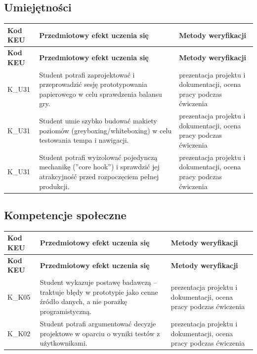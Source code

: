 \documentclass[12pt, a4paper]{article}
\newcommand{\thdrule}{\noalign{\global\setlength{\extrarowheight}{0pt}}}
\newcommand{\thdend}{\noalign{\global\setlength{\extrarowheight}{3pt}}}
\begin{document}
\subsection*{Umiejętności}
{\scriptsize
\begin{longtable}{m{1.6cm}m{9.0cm}m{4.2cm}}
\thdrule\toprule
\rowcolor{pjatkRed} {\color{white}\footnotesize\textbf{\vphantom{Ag}Kod KEU}} & {\color{white}\footnotesize\textbf{\vphantom{Ag}Przedmiotowy efekt uczenia się}} & {\color{white}\footnotesize\textbf{\vphantom{Ag}Metody weryfikacji}} \\
\midrule\thdend
\endfirsthead
\thdrule\toprule
\rowcolor{pjatkRed} {\color{white}\footnotesize\textbf{\vphantom{Ag}Kod KEU}} & {\color{white}\footnotesize\textbf{\vphantom{Ag}Przedmiotowy efekt uczenia się}} & {\color{white}\footnotesize\textbf{\vphantom{Ag}Metody weryfikacji}} \\
\midrule\thdend
\endhead
  \rowcolor{tableRowLight} K\_U31 & Student potrafi zaprojektować i przeprowadzić sesję prototypowania papierowego w celu sprawdzenia balansu gry. & prezentacja projektu i dokumentacji, ocena pracy podczas ćwiczenia \\
  \rowcolor{tableRowAlt} K\_U31 & Student umie szybko budować makiety poziomów (greyboxing/whiteboxing) w celu testowania tempa i nawigacji. & prezentacja projektu i dokumentacji, ocena pracy podczas ćwiczenia \\
  \rowcolor{tableRowLight} K\_U31 & Student potrafi wyizolować pojedynczą mechanikę (''core hook'') i sprawdzić jej atrakcyjność przed rozpoczęciem pełnej produkcji. & prezentacja projektu i dokumentacji, ocena pracy podczas ćwiczenia \\
\bottomrule
\end{longtable}}

\subsection*{Kompetencje społeczne}
{\scriptsize
\begin{longtable}{m{1.6cm}m{9.0cm}m{4.2cm}}
\thdrule\toprule
\rowcolor{pjatkRed} {\color{white}\footnotesize\textbf{\vphantom{Ag}Kod KEU}} & {\color{white}\footnotesize\textbf{\vphantom{Ag}Przedmiotowy efekt uczenia się}} & {\color{white}\footnotesize\textbf{\vphantom{Ag}Metody weryfikacji}} \\
\midrule\thdend
\endfirsthead
\thdrule\toprule
\rowcolor{pjatkRed} {\color{white}\footnotesize\textbf{\vphantom{Ag}Kod KEU}} & {\color{white}\footnotesize\textbf{\vphantom{Ag}Przedmiotowy efekt uczenia się}} & {\color{white}\footnotesize\textbf{\vphantom{Ag}Metody weryfikacji}} \\
\midrule\thdend
\endhead
  \rowcolor{tableRowLight} K\_K05 & Student wykazuje postawę badawczą – traktuje błędy w prototypie jako cenne źródło danych, a nie porażkę programistyczną. & prezentacja projektu i dokumentacji, ocena pracy podczas ćwiczenia \\
  \rowcolor{tableRowAlt} K\_K02 & Student potrafi argumentować decyzje projektowe w oparciu o wyniki testów z użytkownikami. & prezentacja projektu i dokumentacji, ocena pracy podczas ćwiczenia \\
\bottomrule
\end{longtable}}
\end{document}
